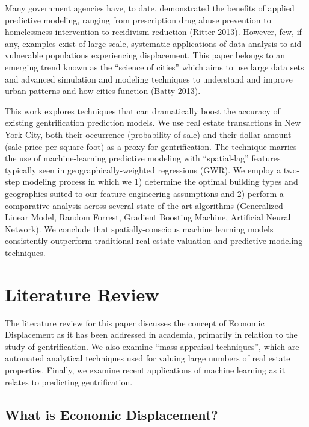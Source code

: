 \documentclass[12pt,]{article}
\begin{document}
Many government agencies have, to date, demonstrated the benefits of
applied predictive modeling, ranging from prescription drug abuse
prevention to homelessness intervention to recidivism reduction (Ritter
2013). However, few, if any, examples exist of large-scale, systematic
applications of data analysis to aid vulnerable populations experiencing
displacement. This paper belongs to an emerging trend known as the
``science of cities'' which aims to use large data sets and advanced
simulation and modeling techniques to understand and improve urban
patterns and how cities function (Batty 2013).

This work explores techniques that can dramatically boost the accuracy
of existing gentrification prediction models. We use real estate
transactions in New York City, both their occurrence (probability of
sale) and their dollar amount (sale price per square foot) as a proxy
for gentrification. The technique marries the use of machine-learning
predictive modeling with ``spatial-lag'' features typically seen in
geographically-weighted regressions (GWR). We employ a two-step modeling
process in which we 1) determine the optimal building types and
geographies suited to our feature engineering assumptions and 2) perform
a comparative analysis across several state-of-the-art algorithms
(Generalized Linear Model, Random Forrest, Gradient Boosting Machine,
Artificial Neural Network). We conclude that spatially-conscious machine
learning models consistently outperform traditional real estate
valuation and predictive modeling techniques.

\hypertarget{literature-review}{%
\section{Literature Review}\label{literature-review}}

The literature review for this paper discusses the concept of Economic
Displacement as it has been addressed in academia, primarily in relation
to the study of gentrification. We also examine ``mass appraisal
techniques'', which are automated analytical techniques used for valuing
large numbers of real estate properties. Finally, we examine recent
applications of machine learning as it relates to predicting
gentrification.

\hypertarget{what-is-economic-displacement}{%
\subsection{What is Economic
Displacement?}\label{what-is-economic-displacement}}
\end{document}
